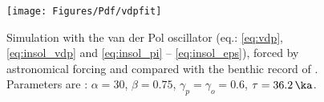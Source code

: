 \begin{figure}
\texttt{[image: Figures/Pdf/vdpfit]}
\caption
{
Simulation with the van der Pol oscillator (eq.: \ref{eq:vdp}, \ref{eq:insol_vdp} and \ref{eq:insol_pi} -- \ref{eq:insol_eps}), forced by astronomical forcing and compared with the benthic record of \cite{lisiecki05lr04}. Parameters are : $\alpha=30$, $\beta=0.75$, $\gamma_p=\gamma_o=0.6$, $\tau=36.2\,\ka$. 
}
\label{fig:vdpfit}
\end{figure}
